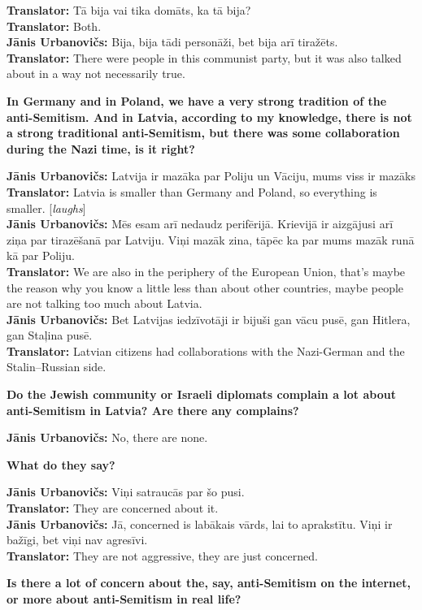 \textbf{Translator:} Tā bija vai tika domāts, ka tā bija? \\
\textbf{Translator:} Both.\\
\textbf{Jānis Urbanovičs:} Bija, bija tādi personāži, bet bija arī tiražēts.\\
\textbf{Translator:} There were people in this communist party, but it was also talked about in a way not necessarily true. 

\textbf{In Germany and in Poland, we have a very strong tradition of the anti-Semitism. And in Latvia, according to my knowledge, there is not a strong traditional anti-Semitism, but there was some collaboration during the Nazi time, is it right?} 

\textbf{Jānis Urbanovičs:} Latvija ir mazāka par Poliju un Vāciju, mums viss ir mazāks\\  
\textbf{Translator:} Latvia is smaller than Germany and Poland, so everything is smaller. [\textit{laughs}]\\
\textbf{Jānis Urbanovičs:} Mēs esam arī nedaudz perifērijā. Krievijā ir aizgājusi arī ziņa par tirazēšanā par Latviju. Viņi mazāk zina, tāpēc ka par mums mazāk runā kā par Poliju.\\  
\textbf{Translator:} We are also in the periphery of the European Union, that’s maybe the reason why you know a little less than about other countries, maybe people are not talking too much about Latvia.\\ 
\textbf{Jānis Urbanovičs:} Bet Latvijas iedzīvotāji ir bijuši gan vācu pusē, gan Hitlera, gan Staļina pusē.\\
\textbf{Translator:} Latvian citizens had collaborations with the Nazi-German and the Stalin–Russian side. 

\textbf{Do the Jewish community or Israeli diplomats complain a lot about anti-Semitism in Latvia? Are there any complains?}  

\textbf{Jānis Urbanovičs:} No, there are none. 

\textbf{What do they say?}  

\textbf{Jānis Urbanovičs:} Viņi satraucās par šo pusi.\\
\textbf{Translator:} They are concerned about it.\\  
\textbf{Jānis Urbanovičs:} Jā, concerned is labākais vārds, lai to aprakstītu. Viņi ir bažīgi, bet viņi nav agresīvi. \\
\textbf{Translator:} They are not aggressive, they are just concerned.  

\textbf{Is there a lot of concern about the, say, anti-Semitism on the internet, or more about anti-Semitism in real life?} 

